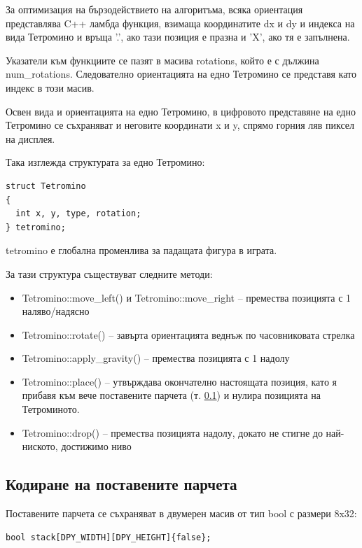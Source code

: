 \documentclass[titlepage, oneside, 14pt]{extbook}
\renewcommand{\texttt}[1]{{\small\ttfamily #1}}
\begin{document}
За оптимизация на бързодействието на алгоритъма, всяка ориентация представлява C++ ламбда функция, взимаща
координатите \texttt{dx} и \texttt{dy} и индекса на вида Тетромино и връща \texttt{'.'}, ако тази позиция е празна
и \texttt{'X'}, ако тя е запълнена.

Указатели към функциите се пазят в масива \texttt{rotations}, който е с дължина \texttt{num_rotations}. Следователно
ориентацията на едно Тетромино се представя като индекс в този масив.

Освен вида и ориентацията на едно Тетромино, в цифровото представяне на едно Тетромино се съхраняват и неговите
координати \texttt{x} и \texttt{y}, спрямо горния ляв пиксел на дисплея.

Така изглежда структурата за едно Тетромино:

\begin{verbatim}
struct Tetromino
{
  int x, y, type, rotation;
} tetromino;
\end{verbatim}

\texttt{tetromino} е глобална променлива за падащата фигура в играта.

За тази структура съществуват следните методи:

\begin{itemize}
  \item \texttt{Tetromino::move_left()} и \texttt{Tetromino::move_right} -- премества позицията с 1 наляво/надясно
  \item \texttt{Tetromino::rotate()} -- завърта ориентацията веднъж по часовниковата стрелка
  \item \texttt{Tetromino::apply_gravity()} -- премества позицията с 1 надолу
  \item \texttt{Tetromino::place()} -- утвърждава окончателно настоящата
    позиция, като я прибавя към вече поставените парчета (т. \ref{stack}) и нулира позицията на Тетроминото.
  \item \texttt{Tetromino::drop()} -- премества позицията надолу, докато не стигне до най-ниското, достижимо ниво
\end{itemize}

\subsection{Кодиране на поставените парчета}
\label{stack}

Поставените парчета се съхраняват в двумерен масив от тип \texttt{bool} с размери 8x32:

\begin{verbatim}
bool stack[DPY_WIDTH][DPY_HEIGHT]{false};
\end{verbatim}
\end{document}
